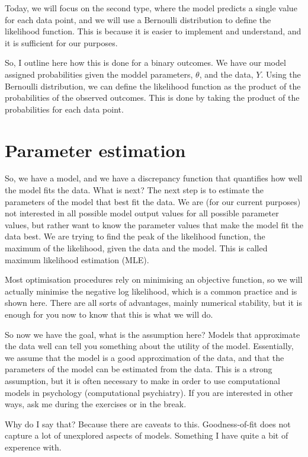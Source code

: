 \documentclass[12pt]{article}
\begin{document}
Today, we will focus on the second type, where the model predicts a single value for each data point, and we will use a Bernoulli distribution to define the likelihood function. This is because it is easier to implement and understand, and it is sufficient for our purposes.

So, I outline here how this is done for a binary outcomes. We have our model assigned probabilities given the moddel parameters, $\theta$, and the data, $Y$. Using the Bernoulli distribution, we can define the likelihood function as the product of the probabilities of the observed outcomes. This is done by taking the product of the probabilities for each data point.

\section{Parameter estimation}

So, we have a model, and we have a discrepancy function that quantifies how well the model fits the data. What is next? The next step is to estimate the parameters of the model that best fit the data. We are (for our current purposes) not interested in all possible model output values for all possible parameter values, but rather want to know the parameter values that make the model fit the data best. We are trying to find the peak of the likelihood function, the maximum of the likelihood, given the data and the model. This is called maximum likelihood estimation (MLE). 

Most optimisation procedures rely on minimising an objective function, so we will actually minimise the negative log likelihood, which is a common practice and is shown here. There are all sorts of advantages, mainly numerical stability, but it is enough for you now to know that this is what we will do.

So now we have the goal, what is the assumption here? Models that approximate the data well can tell you something about the utility of the model. Essentially, we assume that the model is a good approximation of the data, and that the parameters of the model can be estimated from the data. This is a strong assumption, but it is often necessary to make in order to use computational models in psychology (computational psychiatry). If you are interested in other ways, ask me during the exercises or in the break.

Why do I say that? Because there are caveats to this. Goodness-of-fit does not capture a lot of unexplored aspects of models. Something I have quite a bit of experence with.
\end{document}
